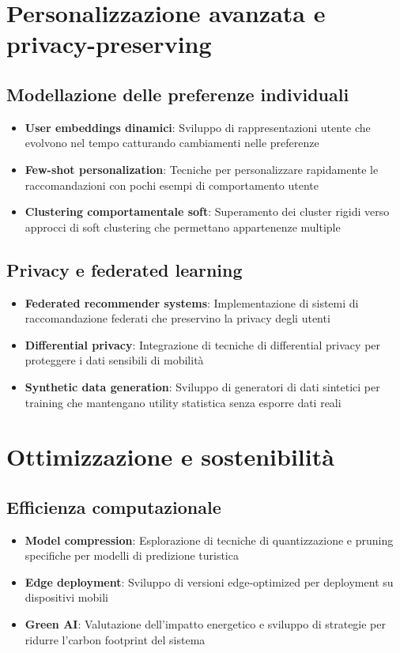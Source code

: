 \section{Personalizzazione avanzata e privacy-preserving}

\subsection{Modellazione delle preferenze individuali}
\begin{itemize}
\item \textbf{User embeddings dinamici}: Sviluppo di rappresentazioni utente che evolvono nel tempo catturando cambiamenti nelle preferenze
\item \textbf{Few-shot personalization}: Tecniche per personalizzare rapidamente le raccomandazioni con pochi esempi di comportamento utente
\item \textbf{Clustering comportamentale soft}: Superamento dei cluster rigidi verso approcci di soft clustering che permettano appartenenze multiple
\end{itemize}

\subsection{Privacy e federated learning}
\begin{itemize}
\item \textbf{Federated recommender systems}: Implementazione di sistemi di raccomandazione federati che preservino la privacy degli utenti
\item \textbf{Differential privacy}: Integrazione di tecniche di differential privacy per proteggere i dati sensibili di mobilità
\item \textbf{Synthetic data generation}: Sviluppo di generatori di dati sintetici per training che mantengano utility statistica senza esporre dati reali
\end{itemize}

\section{Ottimizzazione e sostenibilità}

\subsection{Efficienza computazionale}
\begin{itemize}
\item \textbf{Model compression}: Esplorazione di tecniche di quantizzazione e pruning specifiche per modelli di predizione turistica
\item \textbf{Edge deployment}: Sviluppo di versioni edge-optimized per deployment su dispositivi mobili
\item \textbf{Green AI}: Valutazione dell'impatto energetico e sviluppo di strategie per ridurre l'carbon footprint del sistema
\end{itemize}

